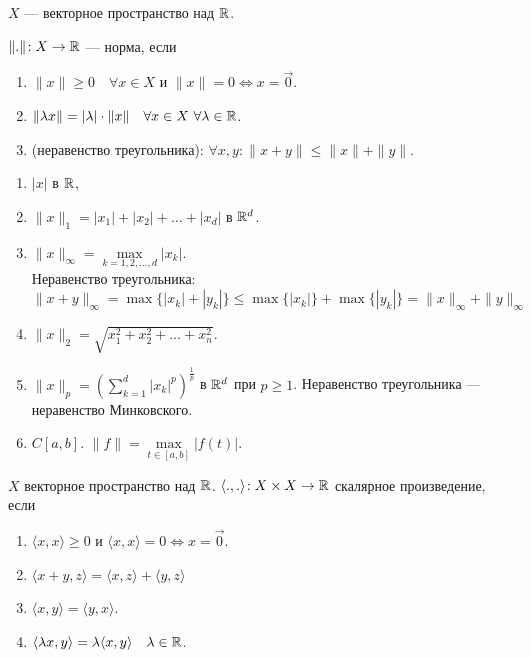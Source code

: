 \begin{definition}
     $X$ --- векторное пространство над  $\mathbb{R}$.

      $\|.\|\!: X \to \mathbb{R}$ --- норма, если
       \begin{enumerate}
           \item $\|x\| \ge 0\quad \forall x \in X$ и $\|x\| = 0 \iff x = \overrightarrow{0}$.
           \item  $\|\lambda x\| = |\lambda| \cdot \|x\|\quad \forall x \in X\ \forall \lambda \in \mathbb{R}$. 
           \item (неравенство треугольника): $\forall x, y\!: \|x + y\| \le \|x\| + \|y\|$.
      \end{enumerate}
\end{definition}
\begin{example}
     \begin{enumerate}
         \item $|x|$ в $\mathbb{R}$,
         \item  $\|x\|_1 = |x_1| + |x_2| + \ldots + |x_d|$ в $\mathbb{R}^d$.
         \item  $\|x\|_{\infty} = \max\limits_{k=1,2,\ldots, d} |x_k|$. \\ Неравенство треугольника: $\|x+y\|_{\infty} = \max\{|x_k|+|y_k|\} \le \max\{|x_k|\} + \max\{|y_k|\} = \|x\|_{\infty} + \|y\|_{\infty}$
         \item $\|x\|_2 = \sqrt{x_1^2 + x_2^2 + \ldots + x_n^2}$.
         \item $\|x\|_p = \left(\sum\limits_{k=1}^d |x_k|^p\right)^{\frac{1}{p}}$ в $\mathbb{R}^d$ при  $p \ge 1$. Неравенство треугольника --- неравенство Минковского.
         \item $C[a, b]$.  $\|f\| = \max\limits_{t \in [a, b]} |f(t)|$. 
     \end{enumerate}
\end{example}
\begin{definition}
    $X$ векторное пространство над  $\mathbb{R}$.  $\langle .,.\rangle\!: X \times X \to \mathbb{R}$ скалярное произведение, если
     \begin{enumerate}
         \item $\langle x, x \rangle \ge 0$ и $\langle x, x \rangle = 0 \iff x = \overrightarrow{0}$.
         \item  $\langle x+y, z\rangle = \langle x, z \rangle + \langle y, z \rangle$
         \item  $\langle x, y \rangle = \langle y, x \rangle$.
         \item  $\langle \lambda x, y \rangle = \lambda \langle x, y \rangle \quad \lambda \in \mathbb{R}$.
    \end{enumerate}
\end{definition}
